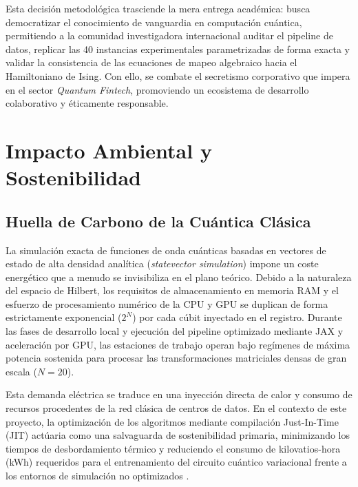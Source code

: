 Esta decisión metodológica trasciende la mera entrega académica: busca democratizar el conocimiento de vanguardia en computación cuántica, permitiendo a la comunidad investigadora internacional auditar el pipeline de datos, replicar las 40 instancias experimentales parametrizadas de forma exacta y validar la consistencia de las ecuaciones de mapeo algebraico hacia el Hamiltoniano de Ising. Con ello, se combate el secretismo corporativo que impera en el sector \textit{Quantum Fintech}, promoviendo un ecosistema de desarrollo colaborativo y éticamente responsable.

\section{Impacto Ambiental y Sostenibilidad}
\label{sec:impacto_ambiental_green}

\subsection{Huella de Carbono de la Cuántica Clásica}
La simulación exacta de funciones de onda cuánticas basadas en vectores de estado de alta densidad analítica (\textit{statevector simulation}) impone un coste energético que a menudo se invisibiliza en el plano teórico. Debido a la naturaleza del espacio de Hilbert, los requisitos de almacenamiento en memoria RAM y el esfuerzo de procesamiento numérico de la CPU y GPU se duplican de forma estrictamente exponencial ($2^N$) por cada cúbit inyectado en el registro. Durante las fases de desarrollo local y ejecución del pipeline optimizado mediante JAX y aceleración por GPU, las estaciones de trabajo operan bajo regímenes de máxima potencia sostenida para procesar las transformaciones matriciales densas de gran escala ($N=20$).

Esta demanda eléctrica se traduce en una inyección directa de calor y consumo de recursos procedentes de la red clásica de centros de datos. En el contexto de este proyecto, la optimización de los algoritmos mediante compilación Just-In-Time (JIT) actúaria como una salvaguarda de sostenibilidad primaria, minimizando los tiempos de desbordamiento térmico y reduciendo el consumo de kilovatios-hora (kWh) requeridos para el entrenamiento del circuito cuántico variacional frente a los entornos de simulación no optimizados \cite{GreenQuantum2023}.

